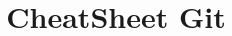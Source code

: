 
\title{ CheatSheet Git}

	\maketitle
	\begin{multicols}{2}
		
		
		
		
		
		
		
		
	\end{multicols}
